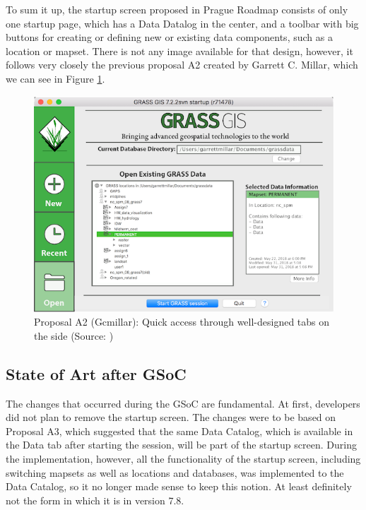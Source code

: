 \documentclass[a4paper,10pt,twoside]{article}
\begin{document}
To sum it up, the startup screen proposed in Prague Roadmap consists of only one 
startup page, which has a Data Datalog in the center, and a toolbar 
with big buttons for creating or defining new or existing data 
components, such as a location or mapset. There is not any image available
for that design, however, it follows very closely the previous proposal A2 
\cite{A2} created by  Garrett C. Millar, which we can see in Figure 
\ref{fig:roadmap_proposal}.

\vspace{0.3cm}
\begin{figure}[hbt!] 
\begin{center}
\includegraphics[width=16cm]{../pictures/roadmap_proposal.png} 
\caption[Proposal A2 (Gcmillar): Quick access through well-designed tabs on the side]{Proposal A2 (Gcmillar): Quick access through well-designed tabs on the side (Source: \cite{A2})}
\label{fig:roadmap_proposal}
\end{center}
\end{figure}

\newpage
\vspace*{-1cm}
\subsection{State of Art after GSoC}
\label{sec:afterGSoC}

\noindent The changes that occurred during the GSoC
are fundamental. At first, developers did not plan to remove the
startup screen. The changes were to be based on Proposal A3, which 
suggested that the same Data Catalog, which is available in the 
Data tab after starting the session, will be part of the startup screen. 
During the implementation, however, all the functionality of the startup screen,
including switching mapsets as well as locations and databases, was
implemented to the Data Catalog, so it no longer made sense to keep this
notion. At least definitely not the form in which it is in version
7.8.
\end{document}
